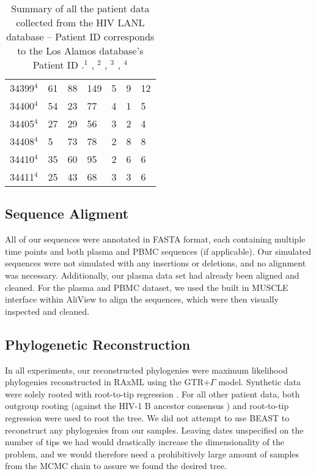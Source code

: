 \begin{table*}[!ht]
\begin{tabularx}{\textwidth}{ X | X | X | X | X | X | X }
34399$^4$ &       61 &       88 &      149 &        5 &        9 &       12  \\ 
34400$^4$ &       54 &       23 &       77 &        4 &        1 &        5  \\ 
34405$^4$ &       27 &       29 &       56 &        3 &        2 &        4  \\ 
34408$^4$ &        5 &       73 &       78 &        2 &        8 &        8 \\ 
34410$^4$ &       35 &       60 &       95 &        2 &        6 &        6 \\ 
34411$^4$ &       25 &       43 &       68 &        3 &        3 &        6   \\ \hline \hline
\end{tabularx}

  \caption{{Summary of all the patient data collected from the HIV LANL database -- Patient ID corresponds to the Los Alamos database's Patient ID \citep{LosAlamos}.\hfill}\hspace{\textwidth}$^1$ \cite{Shankarappa99}, $^2$ \cite{Fischer04}, $^3$ \cite{Llewellyn06},  $^4$ \cite{Novitsky09}
   }
\end{table*}

\subsection{Sequence Aligment} \label{subsec:seqalign}
All of our sequences were annotated in FASTA format, each containing multiple time points and both plasma and PBMC sequences (if applicable). Our simulated sequences were not simulated with any insertions or deletions, and no alignment was necessary. Additionally, our plasma data set \citep{McCloskey14} had already been aligned and cleaned. For the plasma and PBMC dataset, we used the built in MUSCLE \citep{Muscle04} interface within AliView \citep{AliView14} to align the sequences, which were then visually inspected and cleaned. 

\subsection{Phylogenetic Reconstruction} \label{subsec:phylo}
In all experiments, our reconstructed phylogenies were maximum likelihood phylogenies reconstructed in RAxML \citep{Raxml14} using the GTR+$\Gamma$ model. Synthetic data were solely rooted with root-to-tip regression \citep{APE}. For all other patient data, both outgroup rooting (against the HIV-1 B ancestor consensus  ) and root-to-tip regression were used to root the tree. We did not attempt to use BEAST \citep{BEAST} to reconstruct any phylogenies from our samples. Leaving dates unspecified on the number of tips we had would drastically increase the dimensionality of the problem, and we would therefore need a prohibitively large amount of samples from the MCMC chain to assure we found the desired tree.

